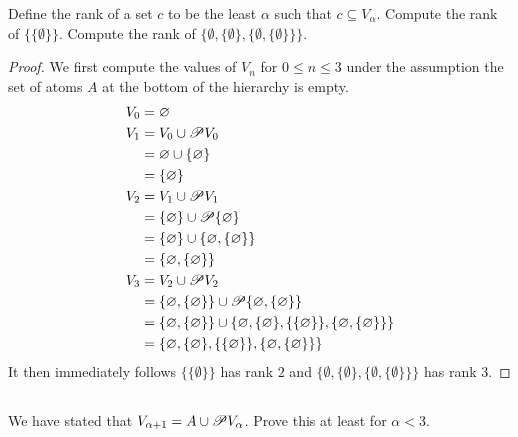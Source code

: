 \documentclass{report}
\begin{document}
  Define the rank of a set $c$ to be the least $\alpha$ such that
    $c \subseteq V_\alpha$.
  Compute the rank of $\{\{\emptyset\}\}$.
  Compute the rank of
    $\{\emptyset, \{\emptyset\}, \{\emptyset, \{\emptyset\}\}\}$.

  \begin{proof}
    We first compute the values of $V_n$ for $0 \leq n \leq 3$ under the
      assumption the set of atoms $A$ at the bottom of the hierarchy is empty.
    \begin{align*}
      V_0 & = \varnothing \\
      V_1 & = V_0 \cup \mathscr{P}V_0 \\
          & = \varnothing \cup \{\varnothing\} \\
          & = \{\varnothing\} \\
      V_2 & = V_1 \cup \mathscr{P}V_1 \\
          & = \{\varnothing\} \cup \mathscr{P}\{\varnothing\} \\
          & = \{\varnothing\} \cup \{\varnothing, \{\varnothing\}\} \\
          & = \{\varnothing, \{\varnothing\}\} \\
      V_3 & = V_2 \cup \mathscr{P}V_2 \\
          & = \{\varnothing, \{\varnothing\}\} \cup
              \mathscr{P}\{\varnothing, \{\varnothing\}\} \\
          & = \{\varnothing, \{\varnothing\}\} \cup
              \{\varnothing,
                \{\varnothing\},
                \{\{\varnothing\}\},
                \{\varnothing, \{\varnothing\}\}\} \\
          & = \{\varnothing,
                \{\varnothing\},
                \{\{\varnothing\}\},
                \{\varnothing, \{\varnothing\}\}\}
    \end{align*}
    It then immediately follows $\{\{\emptyset\}\}$ has rank $2$ and
      $\{\emptyset, \{\emptyset\}, \{\emptyset, \{\emptyset\}\}\}$ has rank $3$.
  \end{proof}

\subsection{}%

  We have stated that $V_{\alpha + 1} = A \cup \mathscr{P}V_\alpha$.
  Prove this at least for $\alpha < 3$.
\end{document}
